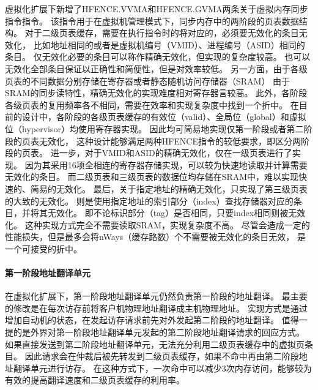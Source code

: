 虚拟化扩展下新增了HFENCE.VVMA和HFENCE.GVMA两条关于虚拟内存同步指令指令。
该指令用于在虚拟机管理模式下，同步内存中的两阶段的页表数据结构。
对于二级页表缓存，需要在执行指令时的将对应的，必须要无效化的条目无效化，
比如地址相同的或者是虚拟机编号（VMID）、进程编号（ASID）相同的条目。
仅无效化必要的条目可以称作精确无效化，但实现的复杂度较高。
也可以无效化全部条目保证以正确性和简便性，但是对效率较低。
另一方面，由于各级页表的不同数据分别存储在寄存器或者静态随机访问存储器（SRAM）
由于SRAM的同步读特性，精确无效化的实现难度相对寄存器言较高。
此外，各阶段各级页表的复用频率各不相同，需要在效率和实现复杂度中找到一个折中。
在目前的设计中，各阶段的各级页表缓存的有效位（valid）、全局位（global）和虚拟位（hypervisor）均使用寄存器实现。
因此均可简易地实现仅第一阶段或者第二阶段的页表无效化，
这种设计能够满足两种HFENCE指令的较低要求，即区分两阶段的页表。
进一步，对于VMID和ASID的精确无效化，仅在一级页表进行了实现。
因为其采用16项全相连的寄存器存储实现，可以较为快速地读取并计算需要无效化的条目。
而二级页表和三级页表的数据位均存储在SRAM中，难以实现快速的、简易的无效化。
最后，关于指定地址的精确无效化，只实现了第三级页表的大致的无效化。
则是使用指定地址的索引部分（index）查找存储器对应的条目，并将其无效化。
即不论标识部分（tag）是否相同，只要index相同则被无效化。
这种实现方式完全不需要读取SRAM，实现复杂度不高。
尽管会造成一定的性能损失，但是最多会将nWays（缓存路数）个不需要被无效化的条目无效，
是一个可接受的折中。

\paragraph{第一阶段地址翻译单元}
在虚拟化扩展下，第一阶段地址翻译单元仍然负责第一阶段的地址翻译。
最主要的修改是在每次访存前将客户机物理地址翻译成主机物理地址。
实现方式是通过增加自动机的状态，在发起访存请求前先对外发起第二阶段的地址翻译。
值得一提的是外界对第一阶段地址翻译单元发起的第二阶段地址翻译请求的回应方式。
如果直接发送到第二阶段地址翻译单元，无法充分利用二级页表缓存中的虚拟页条目。
因此请求会在仲裁后被先转发到二级页表缓存，如果不命中再由第二阶段地址翻译单元进行访存。
在这种方式下，一次命中可以减少3次内存访问，能够较为有效的提高翻译速度和二级页表缓存的利用率。

